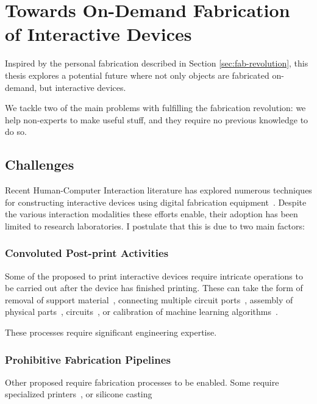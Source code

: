   \section{Towards On-Demand Fabrication of Interactive Devices}
    Inspired by the personal fabrication  described in Section
    \ref{sec:fab-revolution}, this thesis explores a potential future where
    not only objects are fabricated on-demand, but interactive devices.


    We tackle two of the main problems with fulfilling the fabrication
    revolution: we help non-experts to make useful stuff, and they require no
    previous knowledge to do so.

    \subsection{Challenges}
      Recent Human-Computer Interaction literature has explored numerous
      techniques for constructing interactive devices using digital fabrication
      equipment~\cite{Ballagas:2018}. Despite the various interaction modalities
      these efforts enable, their adoption has been limited to research
      laboratories. I postulate that this is due to two main factors:

        \subsubsection{Convoluted Post-print Activities}
          Some of the proposed  to print interactive devices
          require intricate operations to be carried out after the device has
          finished printing. These can take the form of removal of support
          material~\cite{Laput:2015}, connecting multiple circuit
          ports~\cite{Schmitz:2019}, assembly of physical
          parts~\cite{Savage:2015}, circuits~\cite{Murray-Smith:2008}, or
          calibration of machine learning algorithms~\cite{Ono:2013}.

          These processes require significant engineering expertise.

        \subsubsection{Prohibitive Fabrication Pipelines}
          Other proposed  require  fabrication
          processes to be enabled. Some require specialized printers~\cite{}, or
          silicone casting~\cite{He:2017}

